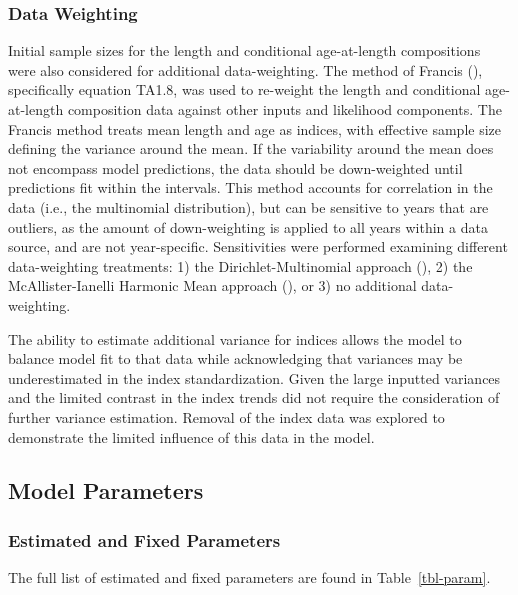\documentclass[
]{scrartcl}
\begin{document}
\subsubsection{Data Weighting}\label{data-weighting}

Initial sample sizes for the length and conditional age-at-length
compositions were also considered for additional data-weighting. The
method of Francis (), specifically
equation TA1.8, was used to re-weight the length and conditional
age-at-length composition data against other inputs and likelihood
components. The Francis method treats mean length and age as indices,
with effective sample size defining the variance around the mean. If the
variability around the mean does not encompass model predictions, the
data should be down-weighted until predictions fit within the intervals.
This method accounts for correlation in the data (i.e., the multinomial
distribution), but can be sensitive to years that are outliers, as the
amount of down-weighting is applied to all years within a data source,
and are not year-specific. Sensitivities were performed examining
different data-weighting treatments: 1) the Dirichlet-Multinomial
approach (), 2) the McAllister-Ianelli Harmonic Mean approach
(),
or 3) no additional data-weighting.

The ability to estimate additional variance for indices allows the model
to balance model fit to that data while acknowledging that variances may
be underestimated in the index standardization. Given the large inputted
variances and the limited contrast in the index trends did not require
the consideration of further variance estimation. Removal of the index
data was explored to demonstrate the limited influence of this data in
the model.

\subsection{Model Parameters}\label{model-parameters}

\subsubsection{Estimated and Fixed
Parameters}\label{estimated-and-fixed-parameters}

The full list of estimated and fixed parameters are found in
Table~\ref{tbl-param}.
\end{document}
